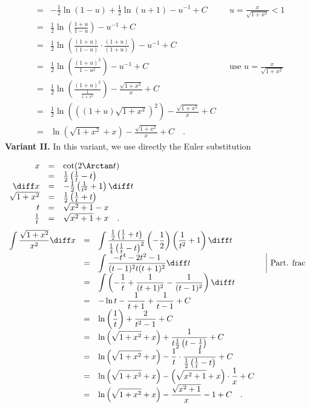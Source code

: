 {\[\begin{array}{rcll|l}
&=&\displaystyle  -\frac{1}{2} \ln{}\left(1-u\right)+ \frac{ 1}{2} \ln{}\left(u+1\right)- u^{-1}   +C&& u=\frac{x}{\sqrt{1+x^2}}<1\\
&=&\displaystyle \frac{1}{2} \ln\left(\frac{1+u}{1-u} \right) - u^{-1}+C  \\
&=&\displaystyle \frac{1}{2} \ln\left(\frac{(1+u)}{(1-u)} \cdot \frac{(1+u)}{(1+u)} \right) - u^{-1}+C  \\
&=&\displaystyle \frac{1}{2} \ln \left( \frac{(1+u)^2}{1-u^2 }\right) - u^{-1}+C&&\text{use }u=\frac{x}{\sqrt{1+x^2}}\\
&=&\displaystyle \frac{1}{2}\ln \left( \frac{ (1+u)^2 }{ \frac{ 1}{1+x^2}} \right)-\frac{\sqrt{1+x^2}}{x}+C\\
&=&\displaystyle \frac{1}{2} \ln \left( \left((1+ u) \sqrt{1 + x^2} \right)^2\right)-\frac{\sqrt{1+x^2}}{x}+C\\
&=&\displaystyle \ln \left(\sqrt{1+x^2}+x \right)-\frac{\sqrt{1+x^2}}{x}+C\quad .
\end{array}
\]
\textbf{Variant II. } In this variant, we use directly the Euler substitution 

$\begin{array}{rcl}
x&=&\cot (2\Arctan t)\\
&=& \frac{1 }{2} \left( \frac{ 1}{t}-t\right)\\ 
\diff x &=&-\frac{1}{2}\left(\frac{1}{t^2}+1\right) \diff t \\
\sqrt{1+x^2}&=&\frac{1}{2}\left(\frac{1}{t}+t\right)\\
t&=&\sqrt{x^2+1}-x\\
\frac{1}{t}&=&\sqrt{x^2+1}+x\quad .
\end{array}
$
\[
\begin{array}{rcll|l}
\displaystyle \int \frac{\sqrt{1+x^2}}{x^2}\diff x&=&\displaystyle \int \frac{ \frac{1}{2} \left( \frac{1}{t}+t\right) }{\frac{1}{4}\left(\frac{1}{t}-t\right)^2} \left(-\frac{1}{2} \right)\left( \frac{1}{t^2}+1\right) \diff t\\
&=&\displaystyle  \int \frac{-t^{4}-2t^{2}-1}{(t-1)^2t(t+1)^2 }\diff t&&\text{Part. frac}\\
&=&\displaystyle \int\left(-\frac{1}{t }+\frac{1}{(t +1)^{2}}-\frac{1}{(t -1)^{2}}\right)\diff t\\
&=&\displaystyle - \ln{}t - \frac{1}{t+1}+\frac{1}{t-1}+C\\
&=&\displaystyle \ln \left(\frac{1}{t} \right) +\frac{2}{t^2-1} +C\\
&=&\displaystyle \ln \left(\sqrt{1+x^2}+x \right)+ \frac{1}{t\frac{1 }{2} \left( t-\frac{1}{t}\right)}+C\\
&=&\displaystyle \ln \left(\sqrt{1+x^2}+x \right)- \frac{1}{t}\cdot \frac{1}{\frac{1}{2} \left( \frac{1 }{t} - t \right) }+C\\
&=&\displaystyle \ln \left(\sqrt{1+x^2}+x \right)- \left( \sqrt{ x^2 +1}+x\right)\cdot \frac{1}{x}+C\\
&=& \displaystyle \ln \left(\sqrt{1+x^2}+x \right)- \frac{ \sqrt{ x^2+1}}{x}-1+C\quad .
\end{array}
\]
}
